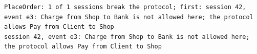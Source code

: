 \begin{lstlisting}[language={},basicstyle=\ttfamily\footnotesize,breaklines=true]
PlaceOrder: 1 of 1 sessions break the protocol; first: session 42, event e3: Charge from Shop to Bank is not allowed here; the protocol allows Pay from Client to Shop
session 42, event e3: Charge from Shop to Bank is not allowed here; the protocol allows Pay from Client to Shop
\end{lstlisting}
